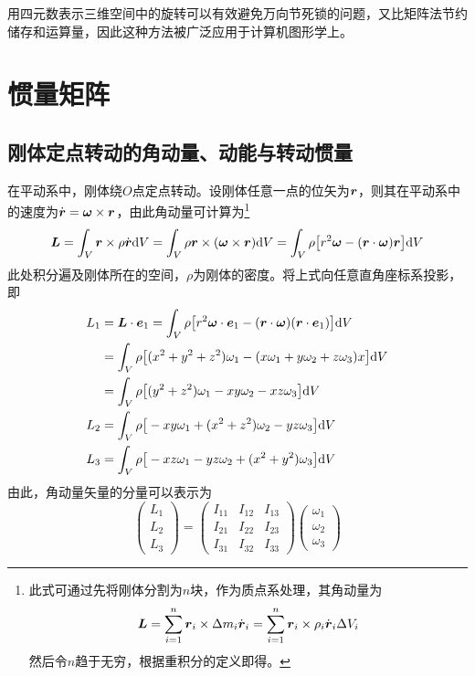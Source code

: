 用四元数表示三维空间中的旋转可以有效避免万向节死锁的问题，又比矩阵法节约储存和运算量，因此这种方法被广泛应用于计算机图形学上。

\section{惯量矩阵}

\subsection{刚体定点转动的角动量、动能与转动惯量}

在平动系中，刚体绕$O$点定点转动。设刚体任意一点的位矢为$\boldsymbol{r}$，则其在平动系中的速度为$\dot{\boldsymbol{r}} = \boldsymbol{\omega} \times \boldsymbol{r}$，由此角动量可计算为\footnote{此式可通过先将刚体分割为$n$块，作为质点系处理，其角动量为\begin{equation*} \boldsymbol{L} = \sum_{i=1}^n \boldsymbol{r}_i \times \Delta m_i \dot{\boldsymbol{r}}_i = \sum_{i=1}^n \boldsymbol{r}_i \times \rho_i \dot{\boldsymbol{r}}_i \Delta V_i \end{equation*}然后令$n$趋于无穷，根据重积分的定义即得。}
\begin{align*}
	\boldsymbol{L} = \int_V \boldsymbol{r} \times \rho \dot{\boldsymbol{r}} \mathrm{d} V = \int_V \rho \boldsymbol{r} \times (\boldsymbol{\omega} \times \boldsymbol{r}) \mathrm{d} V = \int_V \rho \big[r^2 \boldsymbol{\omega} - (\boldsymbol{r} \cdot \boldsymbol{\omega}) \boldsymbol{r} \big] \mathrm{d} V
\end{align*}
此处积分遍及刚体所在的空间，$\rho$为刚体的密度。将上式向任意直角座标系投影，即
\begin{align*}
	L_1 & = \boldsymbol{L} \cdot \boldsymbol{e}_1 = \int_V \rho \big[r^2 \boldsymbol{\omega} \cdot \boldsymbol{e}_1 - (\boldsymbol{r} \cdot \boldsymbol{\omega}) (\boldsymbol{r} \cdot \boldsymbol{e}_1) \big] \mathrm{d} V \\
	& = \int_V \rho \big[(x^2+y^2+z^2) \omega_1 - (x \omega_1 + y\omega_2 + z\omega_3) x \big] \mathrm{d} V \\
	& = \int_V \rho \big[(y^2+z^2)\omega_1 - xy \omega_2 - xz \omega_3\big] \mathrm{d} V \\
	L_2 & = \int_V \rho \big[-xy \omega_1 + (x^2+z^2)\omega_2 - yz \omega_3\big] \mathrm{d} V \\
	L_3 & = \int_V \rho \big[-xz \omega_1 - yz \omega_2 + (x^2+y^2)\omega_3\big] \mathrm{d} V
\end{align*}
由此，角动量矢量的分量可以表示为
\begin{equation}
	\begin{pmatrix} L_1 \\ L_2 \\ L_3 \end{pmatrix} = \begin{pmatrix} I_{11} & I_{12} & I_{13} \\ I_{21} & I_{22} & I_{23} \\ I_{31} & I_{32} & I_{33} \end{pmatrix} \begin{pmatrix} \omega_1 \\ \omega_2 \\ \omega_3 \end{pmatrix}
\end{equation}
